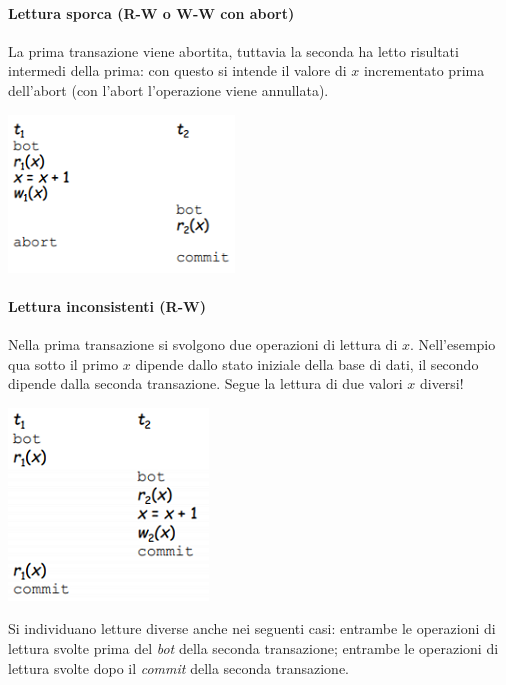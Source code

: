 \begin{multicols}{2}
	\paragraph{Lettura sporca (R-W o W-W con abort)} La prima transazione viene abortita, tuttavia la seconda ha letto risultati intermedi della prima: con questo si intende il valore di $x$ incrementato prima dell'abort (con l'abort l'operazione viene annullata).
	\begin{center}
		\includegraphics{images/154.PNG}
	\end{center}
	\paragraph{Lettura inconsistenti (R-W)} Nella prima transazione si svolgono due operazioni di lettura di $x$. Nell'esempio qua sotto il primo $x$ dipende dallo stato iniziale della base di dati, il secondo dipende dalla seconda transazione. Segue la lettura di due valori $x$ diversi! 
	\begin{center}
		\includegraphics{images/155.PNG}
	\end{center}
	Si individuano letture diverse anche nei seguenti casi: entrambe le operazioni di lettura svolte prima del \emph{bot} della seconda transazione; entrambe le operazioni di lettura svolte dopo il \emph{commit} della seconda transazione.
\end{multicols}
